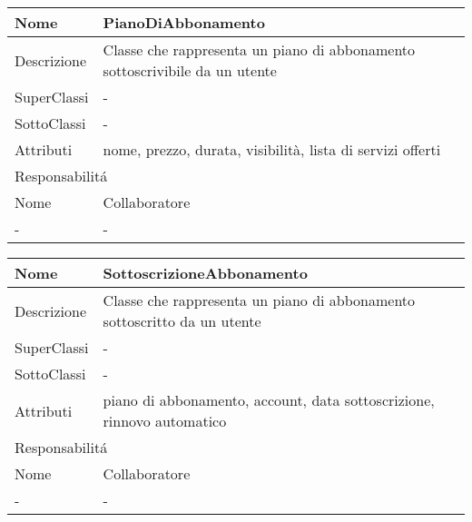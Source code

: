 \begin{center}
    \begin{longtable}{ |p{3cm}|p{3cm}|p{3cm}|p{3cm}| }
        \hline
        Nome & \multicolumn{3}{|p{9cm}|}{PianoDiAbbonamento} \\\hline
        Descrizione & \multicolumn{3}{|p{9cm}|}{Classe che rappresenta un piano di abbonamento sottoscrivibile da un utente} \\\hline
        SuperClassi & \multicolumn{3}{|p{9cm}|}{-} \\\hline
        SottoClassi & \multicolumn{3}{|p{9cm}|}{-} \\\hline
        Attributi & \multicolumn{3}{|p{9cm}|}{nome, prezzo, durata, visibilità, lista di servizi offerti} \\\hline
        \multicolumn{4}{|p{12cm}|}{Responsabilit\'a} \\\hline
        \multicolumn{2}{|p{6cm}|}{Nome} & \multicolumn{2}{|p{6cm}|}{Collaboratore} \\\hline
        \multicolumn{2}{|p{6cm}|}{-} & \multicolumn{2}{|p{6cm}|}{-} \\\hline
    \end{longtable}
\end{center}

\begin{center}
    \begin{longtable}{ |p{3cm}|p{3cm}|p{3cm}|p{3cm}| }
        \hline
        Nome & \multicolumn{3}{|p{9cm}|}{SottoscrizioneAbbonamento} \\\hline
        Descrizione & \multicolumn{3}{|p{9cm}|}{Classe che rappresenta un piano di abbonamento sottoscritto da un utente} \\\hline
        SuperClassi & \multicolumn{3}{|p{9cm}|}{-} \\\hline
        SottoClassi & \multicolumn{3}{|p{9cm}|}{-} \\\hline
        Attributi & \multicolumn{3}{|p{9cm}|}{piano di abbonamento, account, data sottoscrizione, rinnovo automatico} \\\hline
        \multicolumn{4}{|p{12cm}|}{Responsabilit\'a} \\\hline
        \multicolumn{2}{|p{6cm}|}{Nome} & \multicolumn{2}{|p{6cm}|}{Collaboratore} \\\hline
        \multicolumn{2}{|p{6cm}|}{-} & \multicolumn{2}{|p{6cm}|}{-} \\\hline
    \end{longtable}
\end{center}

